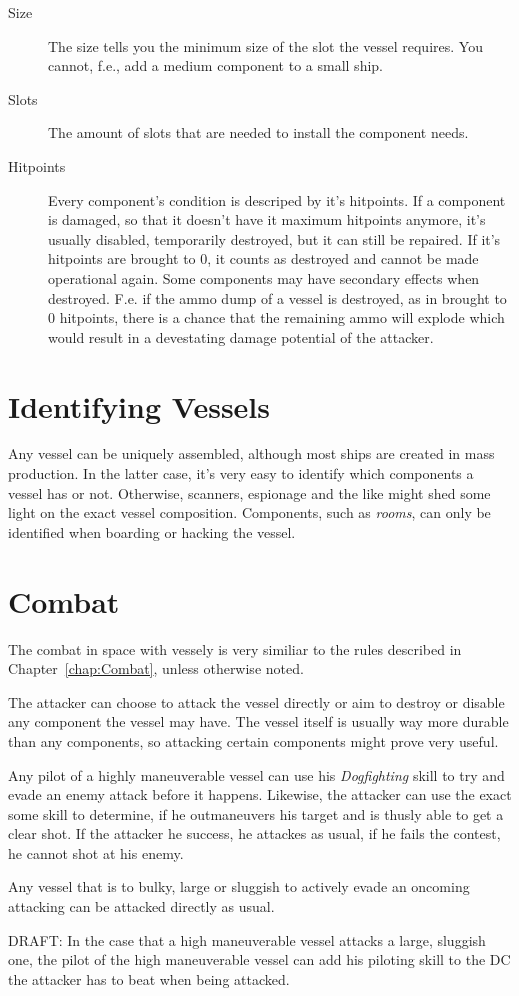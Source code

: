 \begin{description}
  \item[Size] The size tells you the minimum size of the slot the vessel requires. You cannot, f.e., add a medium component to a small ship.
  \item[Slots] The amount of slots that are needed to install the component needs.
  \item[Hitpoints] Every component's condition is descriped by it's hitpoints. If a component is damaged, so that it doesn't have it maximum hitpoints anymore, it's usually disabled, temporarily destroyed, but it can still be repaired. If it's hitpoints are brought to 0, it counts as destroyed and cannot be made operational again. Some components may have secondary effects when destroyed. F.e. if the ammo dump of a vessel is destroyed, as in brought to 0 hitpoints, there is a chance that the remaining ammo will explode which would result in a devestating damage potential of the attacker.
\end{description}


\section{Identifying Vessels}
\label{sec:Vessels-Identifying Vessels}

Any vessel can be uniquely assembled, although most ships are created in mass production. In the latter case, it's very easy to identify which components a vessel has or not. Otherwise, scanners, espionage and the like might shed some light on the exact vessel composition. Components, such as \emph{rooms}, can only be identified when boarding or hacking the vessel.

\section{Combat}
\label{sec:Vessels-Combat}

The combat in space with vessely is very similiar to the rules described in Chapter~\ref{chap:Combat}, unless otherwise noted.

The attacker can choose to attack the vessel directly or aim to destroy or disable any component the vessel may have. The vessel itself is usually way more durable than any components, so attacking certain components might prove very useful.

Any pilot of a highly maneuverable vessel can use his \emph{Dogfighting} skill to try and evade an enemy attack before it happens. Likewise, the attacker can use the exact some skill to determine, if he outmaneuvers his target and is thusly able to get a clear shot. If the attacker he success, he attackes as usual, if he fails the contest, he cannot shot at his enemy.

Any vessel that is to bulky, large or sluggish to actively evade an oncoming attacking can be attacked directly as usual.

DRAFT: In the case that a high maneuverable vessel attacks a large, sluggish one, the pilot of the high maneuverable vessel can add his  piloting skill to the DC the attacker has to beat when being attacked.
